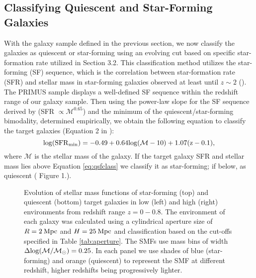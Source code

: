 \documentclass{emulateapj}
\begin{document}
\subsection{Classifying Quiescent and Star-Forming Galaxies} \label{sec:sfq}
With the galaxy sample defined in the previous section, we now classify the galaxies as quiescent or star-forming using an evolving cut based on specific star-formation rate utilized in \cite{Moustakas:2013aa} Section 3.2. This classification method utilizes the star-forming (SF) sequence, which is the correlation between star-formation rate (SFR) and stellar mass in star-forming galaxies observed at least until $z \sim 2$ (\cite{Noeske:2007aa}). The PRIMUS sample displays a well-defined SF sequence within the redshift range of our galaxy sample. Then using the power-law slope for the SF sequence derived by \cite{Salim:2007aa} (SFR $\propto \mathcal{M}^{0.65}$) and the minimum of the quiescent/star-forming bimodality, determined empirically, we obtain the following equation to classify the target galaxies (Equation 2 in \cite{Moustakas:2013aa}):
\begin{equation}
\rm{log}(\rm{SFR}_{\rm{min}}) = -0.49 + 0.64 \rm{log}(\mathcal{M} - 10) +1.07(z-0.1), 
\end{equation} \label{eq:qsfclass} 
where $\mathcal{M}$ is the stellar mass of the galaxy. If the target galaxy SFR and stellar mass lies above Equation \ref{eq:qsfclass} we classify it as star-forming; if below, as quiescent (\cite{Moustakas:2013aa} Figure 1.).

\begin{figure*}
  \begin{center}
    \leavevmode
     \caption{Evolution of stellar mass functions of star-forming (top) and quiescent (bottom) target galaxies in 
low (left) and high (right) environments from redshift range $z=0-0.8$. The environment of each galaxy  
was calculated using a cylindrical aperture size of $R=2 \: \rm{Mpc}$ and $H=25 \: \rm{Mpc}$ and  
classification based on the cut-offs specified in Table \ref{tab:aperture}. The SMFs use mass bins of 
width $\Delta \rm{log}(\mathcal{M}/\mathcal{M}_{\odot})=0.25$. In each panel we use shades of blue 
(star-forming) and orange (quiescent) to represent the SMF at different redshift, higher redshifts being
progressively lighter.}      \label{fig:smf}
    \end{center}
\end{figure*}
\end{document}
